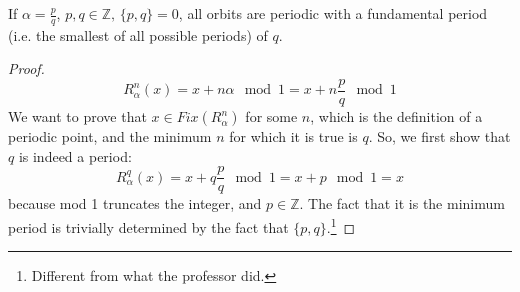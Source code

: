 \begin{proposition}
    If $\alpha=\frac{p}{q}$, $p, q\in\mathbb{Z},\, \{p, q\}=0$, all orbits are periodic with a fundamental period (i.e. the smallest of all possible periods) of $q$.
\end{proposition}
\begin{proof}
    \begin{equation*}
        R_{\alpha}^n(x)=x+n\alpha \mod 1=x+n\frac{p}{q} \mod 1
    \end{equation*}
    We want to prove that $x\in Fix(R_{\alpha}^n)$ for some $n$, which is the definition of a periodic point, and the minimum $n$ for which it is true is $q$.
    So, we first show that $q$ is indeed a period:
    \begin{equation}
        R_{\alpha}^q(x)=x+q\frac{p}{q} \mod 1=x+p \mod 1=x
    \end{equation}
    because mod 1 truncates the integer, and $p\in\mathbb{Z}$. The fact that it is the minimum period is trivially determined by the fact that $\{p,q\}$.\footnote{Different from what the professor did.}
\end{proof}

